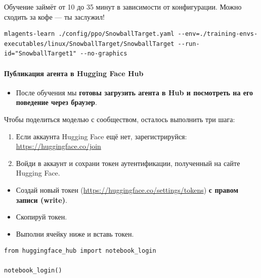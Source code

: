 \documentclass[11pt,a4paper]{article}
\begin{document}
Обучение займёт от 10 до 35 минут в зависимости от конфигурации. Можно сходить за кофе --- ты заслужил!

\begin{lstlisting}
mlagents-learn ./config/ppo/SnowballTarget.yaml --env=./training-envs-executables/linux/SnowballTarget/SnowballTarget --run-id="SnowballTarget1" --no-graphics
\end{lstlisting}

\paragraph{Публикация агента в Hugging Face Hub}\label{push-the-agent-to-the-hugging-face-hub}

\begin{itemize}
\tightlist
\item
  После обучения мы \textbf{готовы загрузить агента в Hub и посмотреть на его поведение через браузер}.
\end{itemize}

Чтобы поделиться моделью с сообществом, осталось выполнить три шага:

\begin{enumerate}
\def\labelenumi{\arabic{enumi}.}
\item
  Если аккаунта Hugging Face ещё нет, зарегистрируйся: \url{https://huggingface.co/join}
\item
  Войди в аккаунт и сохрани токен аутентификации, полученный на сайте Hugging Face.
\end{enumerate}

\begin{itemize}
\tightlist
\item
  Создай новый токен (\url{https://huggingface.co/settings/tokens}) \textbf{с правом записи (write)}.
\end{itemize}


\begin{itemize}
\tightlist
\item
  Скопируй токен.
\item
  Выполни ячейку ниже и вставь токен.
\end{itemize}

\begin{lstlisting}
from huggingface_hub import notebook_login

notebook_login()
\end{lstlisting}
\end{document}
